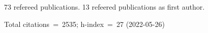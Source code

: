 73 refereed publications. 13 refeered publications as first author.

Total citations~=~2535; h-index~=~27 (2022-05-26)